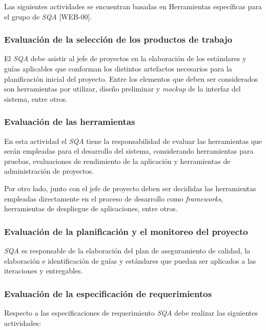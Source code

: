 Las siguientes actividades se encuentran basadas en Herramientas específicas para el grupo de \emph{SQA} [WEB-00].

\subsubsection{Evaluación de la selección de los productos de trabajo}

El \emph{SQA} debe asistir al jefe de proyectos en la elaboración de los estándares y guías aplicables que conforman los distintos artefactos necesarios para la planificación inicial del proyecto. Entre los elementos que deben ser considerados son herramientas por utilizar, diseño preliminar y \emph{mockup} de la interfaz del sistema, entre otros.

\subsubsection{Evaluación de las herramientas} 

En esta actividad el \emph{SQA} tiene la responsabilidad de evaluar las herramientas que serán empleadas para el desarrollo del sistema, considerando herramientas para pruebas, evaluaciones de rendimiento de la aplicación y herramientas de administración de proyectos.

Por otro lado, junto con el jefe de proyecto deben ser decididas las herramientas empleadas directamente en el proceso de desarrollo como \emph{frameworks}, herramientas de despliegue de aplicaciones, entre otros.

\subsubsection{Evaluación de la planificación y el monitoreo del proyecto}

\emph{SQA} es responsable de la elaboración del plan de aseguramiento de calidad, la elaboración e identificación de guías y estándares que puedan ser aplicados a las iteraciones y entregables.

\subsubsection{Evaluación de la especificación de requerimientos}

Respecto a las especificaciones de requerimiento \emph{SQA} debe realizar las siguientes actividades:

